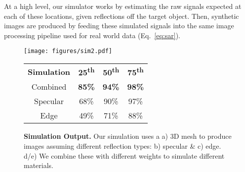 At a high level, our simulator works by estimating the raw signals expected at each of these locations, given reflections off the target object. Then, synthetic images are produced by feeding these simulated signals into the same image processing pipeline used for real world data (Eq.~\ref{eq:sar}).


\begin{figure*}
\begin{minipage}[t]{0.73\linewidth}
\centering
    \texttt{[image: figures/sim2.pdf]}
    \vspace{-0.265in}
    \caption{\footnotesize{\textbf{Simulation Output.}} \textnormal{Our simulation uses a a) 3D mesh to produce images assuming different reflection types: b) specular \& c) edge. d/e) We combine these with different weights to simulate different materials.}}
    \label{fig:sim}
    \vspace{-0.2in}
\end{minipage}
\hfill
\begin{minipage}[t]{0.26\linewidth}
\label{table:sim}
\vspace{-0.6in}
\footnotesize
\label{table:sim}
\begin{tabular}{ |c|c|c|c| }
 \hline \textbf{Simulation} &\textbf{25\textsuperscript{th}} &\textbf{50\textsuperscript{th}} &\textbf{75\textsuperscript{th}}     \\  
    \Xhline{3.5\arrayrulewidth} %
 Combined   &  \textbf{85\%} & \textbf{94\%} & \textbf{98\%}  \\  \Xhline{3.5\arrayrulewidth} %
 Specular & 68\% & 90\% & 97\%\\ \hline
    Edge  & 49\% & 71\%  & 88\%\\\hline
\end{tabular}
\vspace{-0.08in}
\vspace{-0.2in}
\label{table:sim}
\end{minipage}
\end{figure*}


